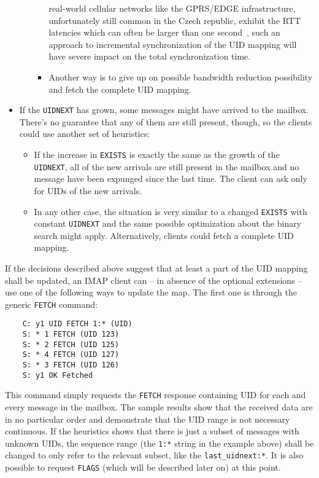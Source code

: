 \documentclass[trojita]{subfiles}
\begin{document}
\begin{itemize}
\begin{itemize}
\begin{itemize}
            real-world cellular networks like the GPRS/EDGE infrastructure, unfortunately still common in the Czech
            republic, exhibit the RTT latencies which can often be larger than one second~\cite{gprs-rtt-report}, such
            an approach to incremental synchronization of the UID mapping will have severe impact on the total
            synchronization time.
          \item Another way is to give up on possible bandwidth reduction possibility and fetch the complete UID
            mapping.
        \end{itemize}
    \end{itemize}
  \item If the {\tt UIDNEXT} has grown, some messages might have arrived to the mailbox.  There's no guarantee that any
    of them are still present, though, so the clients could use another set of heuristics:
    \begin{itemize}
      \item If the increase in {\tt EXISTS} is exactly the same as the growth of the {\tt UIDNEXT}, all of the new
        arrivals are still present in the mailbox and no message have been expunged since the last time.  The client can
        ask only for UIDs of the new arrivals.
      \item In any other case, the situation is very similar to a changed {\tt EXISTS} with constant {\tt UIDNEXT} and
        the same possible optimization about the binary search might apply.  Alternatively, clients could fetch a
        complete UID mapping.
    \end{itemize}
\end{itemize}

If the decisions described above suggest that at least a part of the UID mapping shall be updated, an IMAP client can --
in absence of the optional extensions -- use one of the following ways to update the map.  The first one is through the
generic {\tt FETCH} command:

\begin{verbatim}
    C: y1 UID FETCH 1:* (UID)
    S: * 1 FETCH (UID 123)
    S: * 2 FETCH (UID 125)
    S: * 4 FETCH (UID 127)
    S: * 3 FETCH (UID 126)
    S: y1 OK Fetched
\end{verbatim}

This command simply requests the {\tt FETCH} response containing UID for each and every message in the mailbox.  The
sample results show that the received data are in no particular order and demonstrate that the UID range is not
necessary continuous.  If the heuristics shows that there is just a subset of messages with unknown UIDs,
the sequence range (the {\tt 1:*} string in the example above) shall be changed to only refer to the relevant subset,
like the {\tt last\_uidnext:*}.  It is also possible to request {\tt FLAGS} (which will be described later on) at this
point.
\end{document}
